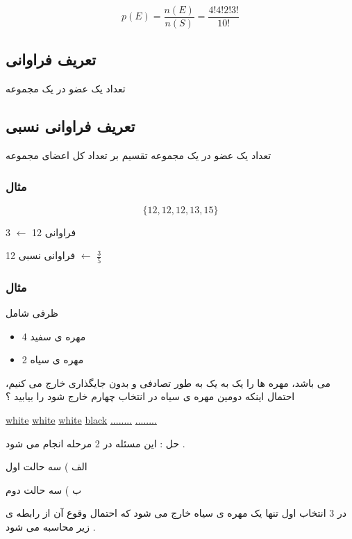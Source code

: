 \documentclass[12pt]{book}
\begin{document}
$$
p(E) = \frac{n(E)}{n(S)} = \frac{4!4!2!3!}{10!}
$$


\subsection{تعریف فراوانی}
تعداد یک عضو در یک مجموعه

\subsection{تعریف فراوانی نسبی}
تعداد یک عضو در یک مجموعه تقسیم بر تعداد کل اعضای مجموعه

\subsubsection{مثال}

$$
\{ 12, 12, 12, 13, 15 \}
$$

فراوانی 12 $\leftarrow $   3


فراوانی نسبی 12  $  \leftarrow  $    $  \frac{3}{5} $ 

\subsubsection{مثال}

ظرفی شامل 
\begin{itemize}
	\item 4 مهره ی سفید
	\item 2 مهره ی سیاه
\end{itemize}
می باشد، مهره ها را یک به یک به طور تصادفی و بدون جایگذاری خارج می کنیم، احتمال اینکه دومین مهره ی سیاه در انتخاب چهارم خارج شود را بیابید ؟\newline

\begin{latin}
\underline{white} \underline{white} \underline{white} \underline{black} \underline{........} \underline{........}
\end{latin}

حل : این مسئله در 2 مرحله انجام می شود .

الف ) سه حالت اول

ب ) سه حالت دوم

در 3 انتخاب اول تنها یک مهره ی سیاه خارج می شود که احتمال وقوع آن از رابطه ی زیر محاسبه می شود .

\end{document}
